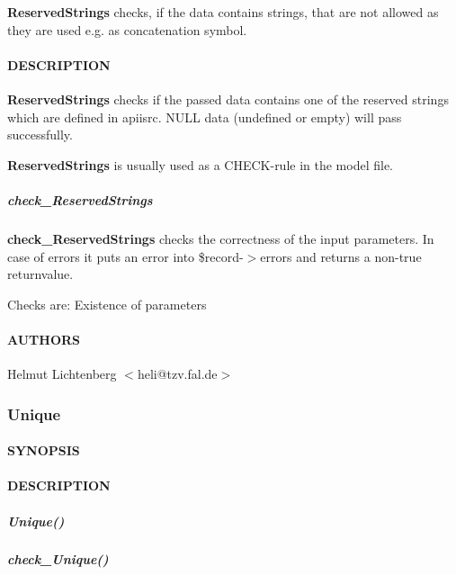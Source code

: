 \textbf{ReservedStrings} checks, if the data contains strings, that are not
allowed as they are used e.g. as concatenation symbol.

\paragraph*{DESCRIPTION\label{ReservedStrings_DESCRIPTION}}


\textbf{ReservedStrings} checks if the passed data contains one of the reserved
strings which are defined in apiisrc. NULL data (undefined or empty) will
pass successfully.



\textbf{ReservedStrings} is usually used as a CHECK-rule in the model file.

\subparagraph*{check\_ReservedStrings\label{ReservedStrings_check_ReservedStrings}}


\textbf{check\_ReservedStrings} checks the correctness of the input parameters.
In case of errors it puts an error into \$record-$>$errors and returns a
non-true returnvalue.



Checks are:
   Existence of parameters

\paragraph*{AUTHORS\label{ReservedStrings_AUTHORS}}


Helmut Lichtenberg $<$heli@tzv.fal.de$>$

\subsubsection{Unique\label{Unique}}




\paragraph*{SYNOPSIS\label{Unique_SYNOPSIS}}
\paragraph*{DESCRIPTION\label{Unique_DESCRIPTION}}
\subparagraph*{Unique()\label{Unique_Unique_}}
\subparagraph*{check\_Unique()\label{Unique_check_Unique_}}


